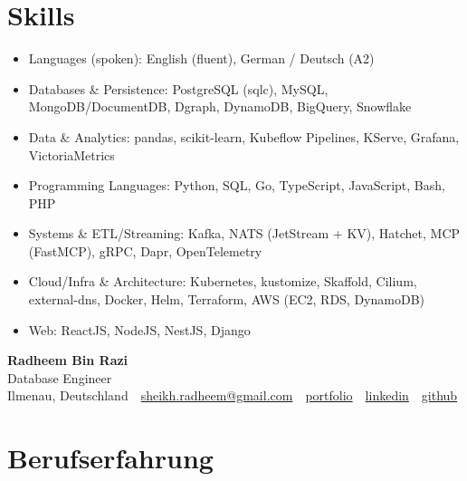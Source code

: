 \documentclass[10pt,a4paper]{resume}
\makeatletter
\newcommand{\Portfolio}{https://radheem.github.io/my-cv}
\newcommand{\PortfolioText}{portfolio}
\newcommand{\GitHub}{https://github.com/radheem}
\newcommand{\LinkedIn}{https://www.linkedin.com/in/radheem-razi}
\newcommand{\Email}{sheikh.radheem@gmail.com}
\makeatother
\begin{document}
\section{Skills}

\begin{itemize}[leftmargin=1.4em,nosep,topsep=2pt]
  \item Languages (spoken): English (fluent), German / Deutsch (A2)
  \item Databases \& Persistence: PostgreSQL (sqlc), MySQL, MongoDB/DocumentDB, Dgraph, DynamoDB, BigQuery, Snowflake
  \item Data \& Analytics: pandas, scikit-learn, Kubeflow Pipelines, KServe, Grafana, VictoriaMetrics
  \item Programming Languages: Python, SQL, Go, TypeScript, JavaScript, Bash, PHP
  \item Systems \& ETL/Streaming: Kafka, NATS (JetStream + KV), Hatchet, MCP (FastMCP), gRPC, Dapr, OpenTelemetry
  \item Cloud/Infra \& Architecture: Kubernetes, kustomize, Skaffold, Cilium, external-dns, Docker, Helm, Terraform, AWS (EC2, RDS, DynamoDB)
  \item Web: ReactJS, NodeJS, NestJS, Django
\end{itemize}

\clearpage
{}

\begin{center}
  {\huge\bfseries Radheem Bin Razi}\\[3pt]
  {\large Database Engineer}\\[6pt]
  \small
  Ilmenau, Deutschland \,\textbar\,
  \href{mailto:\Email}{\Email} \,\textbar\,
  \href{\Portfolio}{\PortfolioText} \,\textbar\,
  \href{\LinkedIn}{linkedin} \,\textbar\,
  \href{\GitHub}{github}
\end{center}
\vspace{2pt}

\section{Berufserfahrung}
\end{document}
